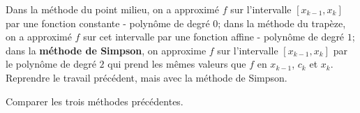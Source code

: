 \documentclass{exam}
\begin{document}
\begin{questions}
\question
Dans la méthode du point milieu, on a approximé $f$ sur l'intervalle $[x_{k-1}, x_k]$ par une fonction constante - polynôme de degré $0$; dans la méthode du trapèze, on a approximé $f$ sur cet intervalle par une fonction affine - polynôme de degré $1$; dans la {\bf méthode de Simpson}, on approxime $f$ sur l'intervalle $[x_{k-1}, x_k]$ par le polynôme de degré $2$ qui prend les mêmes valeurs que $f$ en $x_{k-1}$, $c_k$ et $x_k$.\\
Reprendre le travail précédent, mais avec la méthode de Simpson.

\question
Comparer les trois méthodes précédentes.

\end{questions}
\end{document}
